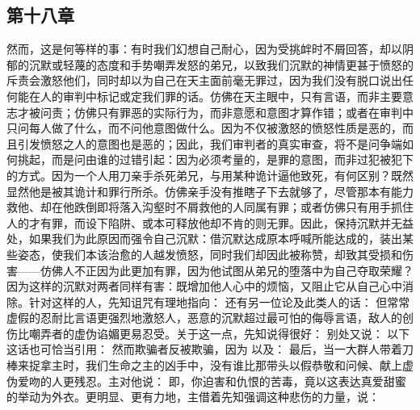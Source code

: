 
\subsection{第十八章}

\par

然而，这是何等样的事：有时我们幻想自己耐心，因为受挑衅时不屑回答，却以阴郁的沉默或轻蔑的态度和手势嘲弄发怒的弟兄，以致我们沉默的神情更甚于愤怒的斥责会激怒他们，同时却以为自己在天主面前毫无罪过，因为我们没有脱口说出任何能在人的审判中标记或定我们罪的话。仿佛在天主眼中，只有言语，而非主要意志才被问责；仿佛只有罪恶的实际行为，而非意愿和意图才算作错；或者在审判中只问每人做了什么，而不问他意图做什么。因为不仅被激怒的愤怒性质是恶的，而且引发愤怒之人的意图也是恶的；因此，我们审判者的真实审查，将不是问争端如何挑起，而是问由谁的过错引起：因为必须考量的，是罪的意图，而非过犯被犯下的方式。因为一个人用刀亲手杀死弟兄，与用某种诡计逼他致死，有何区别？既然显然他是被其诡计和罪行所杀。仿佛亲手没有推瞎子下去就够了，尽管那本有能力救他、却在他跌倒即将落入沟壑时不屑救他的人同属有罪；或者仿佛只有用手抓住人的才有罪，而设下陷阱、或本可释放他却不肯的则无罪。因此，保持沉默并无益处，如果我们为此原因而强令自己沉默：借沉默达成原本呼喊所能达成的，装出某些姿态，使我们本该治愈的人越发愤怒，同时我们却因此被称赞，却致其受损和伤害——仿佛人不正因为此更加有罪，因为他试图从弟兄的堕落中为自己夺取荣耀？因为这样的沉默对两者同样有害：既增加他人心中的烦恼，又阻止它从自己心中消除。针对这样的人，先知诅咒有理地指向： 还有另一位论及此类人的话： 但常常虚假的忍耐比言语更强烈地激怒人，恶意的沉默超过最可怕的侮辱言语，敌人的创伤比嘲弄者的虚伪谄媚更易忍受。关于这一点，先知说得很好： 别处又说： 以下这话也可恰当引用： 然而欺骗者反被欺骗，因为 以及： 最后，当一大群人带着刀棒来捉拿主时，我们生命之主的凶手中，没有谁比那带头以假恭敬和问候、献上虚伪爱吻的人更残忍。主对他说： 即，你迫害和仇恨的苦毒，竟以这表达真爱甜蜜的举动为外衣。更明显、更有力地，主借着先知强调这种悲伤的力量，说：\par

